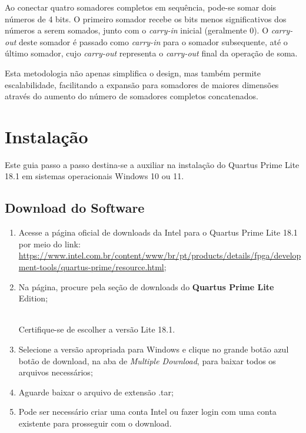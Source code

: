 \documentclass[12pt,a4paper]{article}
\newcommand{\DonwloadUrl}{\url{https://www.intel.com.br/content/www/br/pt/products/details/fpga/development-tools/quartus-prime/resource.html}}
\newcommand{\Version}{18.1}
\newcommand{\Atention}[1]{
    \begin{tcolorbox}[colback=red!5!white,colframe=red!75!black]
    \begin{center}
    \faExclamationTriangle{}\\#1
    \end{center}
    \end{tcolorbox}
}
\begin{document}
Ao conectar quatro somadores completos em sequência, pode-se somar dois números de 4 bits. O primeiro somador recebe os bits menos significativos dos números a serem somados, junto com o \textit{carry-in} inicial (geralmente 0). O \textit{carry-out} deste somador é passado como \textit{carry-in} para o somador subsequente, até o último somador, cujo \textit{carry-out} representa o \textit{carry-out} final da operação de soma.

Esta metodologia não apenas simplifica o design, mas também permite escalabilidade, facilitando a expansão para somadores de maiores dimensões através do aumento do número de somadores completos concatenados. %

\section{Instalação}

Este guia passo a passo destina-se a auxiliar na instalação do Quartus Prime Lite \Version{} em sistemas operacionais Windows 10 ou 11.

\subsection{Download do Software}

\begin{enumerate}
    \item Acesse a página oficial de downloads da Intel para o Quartus Prime Lite \Version{} por meio do link: \DonwloadUrl;
    \item Na página, procure pela seção de downloads do \textbf{Quartus Prime Lite} Edition;
    
    \Atention{Certifique-se de escolher a versão Lite \Version.}

    \item Selecione a versão apropriada para Windows e clique no grande botão azul botão de download, na aba de \textit{Multiple Download}, para baixar todos os arquivos necessários;
    \item Aguarde baixar o arquivo de extensão .tar;
    \item Pode ser necessário criar uma conta Intel ou fazer login com uma conta existente para prosseguir com o download.
\end{enumerate}
\end{document}
